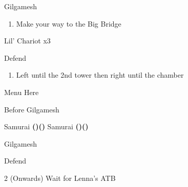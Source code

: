 \begin{paracol}{2}
\begin{boss}{Gilgamesh}
	\varwb
	\begin{round}{1}
        \galuf \leftCommand{\gilToss}
    \end{round}
	\varwe
\end{boss}

\begin{enumerate}
    \item Make your way to the Big Bridge
\end{enumerate}

\begin{encounter}{Lil' Chariot x3}
	\varwb
	\begin{round}{1}
		\bartz Defend
        \lenna \leftCommand{\throw} \then \thunderScroll
    \end{round}
	\varwe
\end{encounter}

\begin{enumerate}[resume]
    \item Left until the 2nd tower then right until the chamber
\end{enumerate}

\switchcolumn*
\begin{misc}{Menu Here}
\end{misc}

\switchcolumn
\begin{menu}{Before Gilgamesh}
    \varwb
    \begin{jobMenu}
        \lenna Samurai \textbf{(\pointLeft)(\pointDown)} \optimize
        \bartz Samurai \textbf{(\pointLeft)(\pointDown)}
    \end{jobMenu}
    \begin{magicMenu}
        \galuf \cure \space \then {}
    \end{magicMenu}
    \varwe
\end{menu}

\begin{boss}{Gilgamesh}
	\varwb
	\begin{round}{1}
        \faris Defend
        \lenna \leftCommand{\gilToss}
        \bartz \leftCommand{\gilToss}
        \galuf \leftCommand{\gilToss}
    \end{round}
    \begin{round}{2 (Onwards)}
        \faris Wait for Lenna's ATB \then \leftCommand{\gilToss}
        \item {}
        \item {}
        \vspace{1mm}
        \item[] 
        \lenna \leftCommand{\gilToss} 
        \anyone \leftCommand{\gilToss}
        \anyone \leftCommand{\gilToss}
    \end{round}
	\varwe
\end{boss}


\end{paracol}
